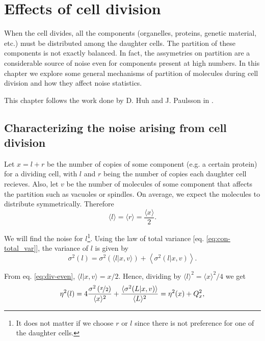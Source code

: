 \chapter{Effects of cell division}
\label{ch:div}

When the cell divides, all the components (organelles, proteins, genetic material, etc.) must be distributed among the daughter cells. The partition of these components is not exactly balanced. In fact, the assymetries on partition are a considerable source of noise even for components present at high numbers. In this chapter we explore some general mechanisms of partition of molecules during cell division and how they affect noise statistics.

This chapter follows the work done by D. Huh and J. Paulsson in \cite{huh11b}.

\section{Characterizing the noise arising from cell division}

Let $x = l+r$ be the number of copies of some component (e.g. a certain protein) for a dividing cell, with $l$ and $r$ being the number of copies each daughter cell recieves. Also, let $v$ be the number of molecules of some component that affects the partition such as vacuoles or spindles. On average, we expect the molecules to distribute symmetrically. Therefore
\begin{equation}
  \label{eq:div-even}
  \langle l\rangle = \langle r\rangle = \frac{\langle x\rangle}{2}.
\end{equation}

We will find the noise for $l$\footnote{It does not matter if we choose $r$ or $l$ since there is not preference for one of the daughter cells.}. Using the law of total variance [eq. \eqref{eq:con-total_var}], the variance of $l$ is given by
\begin{equation*}
  \sigma^2(l) = \sigma^2\left(\langle l|x,v\rangle\right) + \left\langle\sigma^2(l|x,v)\right\rangle.
\end{equation*}

From eq. \eqref{eq:div-even}, $\langle l|x,v\rangle = x/2$. Hence, dividing by $\langle l\rangle^2 = \langle x\rangle^2/4$ we get
\begin{equation}
  \label{eq:div-noises}
  \eta^2(l) = 4\frac{\sigma^2\left(\nicefrac{x}{2}\right)}{\langle x\rangle^2}+\frac{\langle\sigma^2(L|x,v)\rangle}{\langle L\rangle^2}=\eta^2(x) + Q_x^2,
\end{equation}

